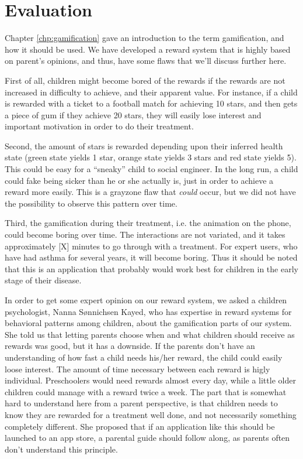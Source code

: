  
\section{Evaluation}

Chapter \ref{chp:gamification} gave an introduction to the term gamification, and how it should be used. We have developed a reward system that is highly based on parent's opinions, and thus, have some flaws that we'll discuss further here.

First of all, children might become bored of the rewards if the rewards are not increased in difficulty to achieve, and their apparent value. For instance, if a child is rewarded with a ticket to a football match for achieving 10 stars, and then gets a piece of gum if they achieve 20 stars, they will easily lose interest and important motivation in order to do their treatment. 

Second, the amount of stars is rewarded depending upon their inferred health state (green state yields 1 star, orange state yields 3 stars and red state yields 5). This could be easy for a ``sneaky'' child to social engineer. In the long run, a child could fake being sicker than he or she actually is, just in order to achieve a reward more easily. This is a grayzone flaw that \emph{could} occur, but we did not have the possibility to observe this pattern over time.

Third, the gamification during their treatment, i.e. the animation on the phone, could become boring over time. 
The interactions are not variated, and it takes approximately [X] minutes to go through with a treatment. For expert users, who have had asthma for several years, it will become boring. Thus it should be noted that this is an application that probably would work best for children in the early stage of their disease.      

In order to get some expert opinion on our reward system, we asked a children psychologist, Nanna S\o nnichsen Kayed, who has expertise in reward systems for behavioral patterns among children, about the gamification parts of our system. 
She told us that letting parents choose when and what children should receive as rewards was good, but it has a downside. If the parents don't have an understanding of how fast a child needs his/her reward, the child could easily loose interest. The amount of time necessary between each reward is higly individual. Preschoolers would need rewards almost every day, while a little older children could manage with a reward twice a week. The part that is somewhat hard to understand here from a parent perspective, is that children needs to know they are rewarded for a treatment well done, and not necessarily something completely different. She proposed that if an application like this should be launched to an app store, a parental guide should follow along, as parents often don't understand this principle.

